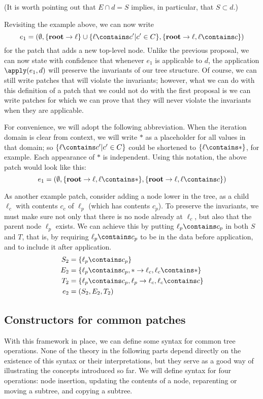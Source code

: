 \documentclass{article}
\newcommand{\mbf}[1]{\ensuremath{\mathbf{#1}}}
\renewcommand{\root}{\mbf{root}\xspace}
\begin{document}
(It is worth pointing out that $E \cap d = S$ implies, in particular, that
$S \subset d$.)

Revisiting the example above, we can now write
\[e_1 = (\emptyset,\{\root \to \ell\}\cup\{\ell \contains c' | c' \in
C\},\{\root \to \ell, \ell \contains c\})\]
for the patch that adds a new top-level node. Unlike the previous proposal,
we can now state with confidence that whenever $e_1$ is applicable to $d$,
the application $\apply(e_1,d)$ will preserve the invariants of our tree
structure. Of course, we can still write patches that will violate the
invariants; however, what we can do with this definition of a patch that we
could not do with the first proposal is we can write patches for which we
can prove that they will never violate the invariants when they are
applicable.

For convenience, we will adopt the following abbreviation.  When the
iteration domain is clear from context, we will write $*$ as a placeholder
for all values in that domain; so $\{\ell \contains c' | c' \in C\}$ could
be shortened to $\{\ell \contains *\}$, for example. Each appearance of $*$
is independent. Using this notation, the above patch would look like this:
\[e_1 = (\emptyset,\{\root \to \ell,\ell \contains *\},\{\root \to \ell,\ell
\contains c\})\]

As another example patch, consider adding a node lower in the tree, as a
child $\ell_c$ with contents $c_c$ of $\ell_p$ (which has contents $c_p$).
To preserve the invariants, we must make sure not only that there is no node
already at $\ell_c$, but also that the parent node $\ell_p$ exists.  We can
achieve this by putting $\ell_p \contains c_p$ in both $S$ and $T$, that is,
by requiring $\ell_p \contains c_p$ to be in the data before application,
and to include it after application.
\begin{align*}
    S_2 &= \{\ell_p \contains c_p\} \\
    E_2 &= \{\ell_p \contains c_p, * \to \ell_c, \ell_c \contains *\} \\
    T_2 &= \{\ell_p \contains c_p, \ell_p \to \ell_c, \ell_c \contains c\} \\
    e_2 &= (S_2,E_2,T_2)
\end{align*}

\subsection{Constructors for common patches}
With this framework in place, we can define some syntax for common tree
operations. None of the theory in the following parts depend directly on the
existence of this syntax or their interpretations, but they serve as a good
way of illustrating the concepts introduced so far.  We will define syntax
for four operations: node insertion, updating the contents of a node,
reparenting or moving a subtree, and copying a subtree.
\end{document}
